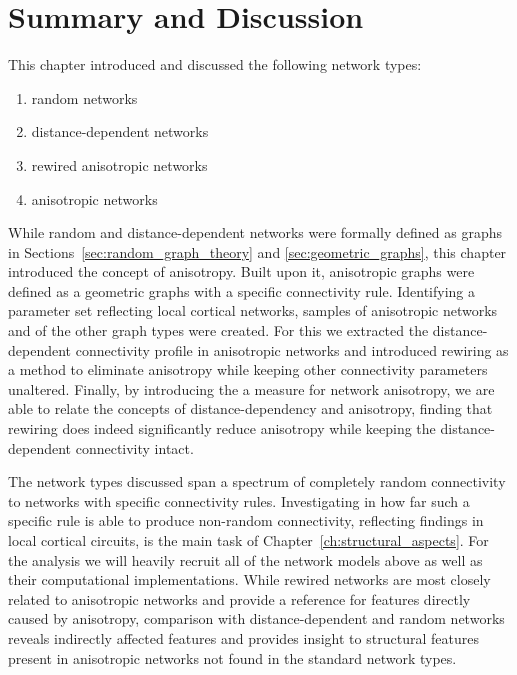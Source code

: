 

\newpage
\section{Summary and Discussion}

This chapter introduced and discussed the following network types:
\begin{enumerate} 
  \itemsep-11pt
  \item random networks
  \item distance-dependent networks
  \item rewired anisotropic networks
  \item anisotropic networks
\end{enumerate}
While random and distance-dependent networks were formally defined as
graphs in Sections~\ref{sec:random_graph_theory} and
\ref{sec:geometric_graphs}, this chapter introduced the concept of
anisotropy. Built upon it, anisotropic graphs were defined as a
geometric graphs with a specific connectivity rule. Identifying a
parameter set reflecting local cortical networks, samples of
anisotropic networks and of the other graph types were created. For
this we extracted the distance-dependent connectivity profile in
anisotropic networks and introduced rewiring as a method to eliminate
anisotropy while keeping other connectivity parameters unaltered.
Finally, by introducing the a measure for network anisotropy, we are
able to relate the concepts of distance-dependency and anisotropy,
finding that rewiring does indeed significantly reduce anisotropy
while keeping the distance-dependent connectivity intact.

The network types discussed span a spectrum of completely random
connectivity to networks with specific connectivity
rules. Investigating in how far such a specific rule is able to
produce non-random connectivity, reflecting findings in local cortical
circuits, is the main task of Chapter~\ref{ch:structural_aspects}. For
the analysis we will heavily recruit all of the network models above
as well as their computational implementations. While rewired networks
are most closely related to anisotropic networks and provide a
reference for features directly caused by anisotropy, comparison with
distance-dependent and random networks reveals indirectly affected
features and provides insight to structural features present in
anisotropic networks not found in the standard network types.


